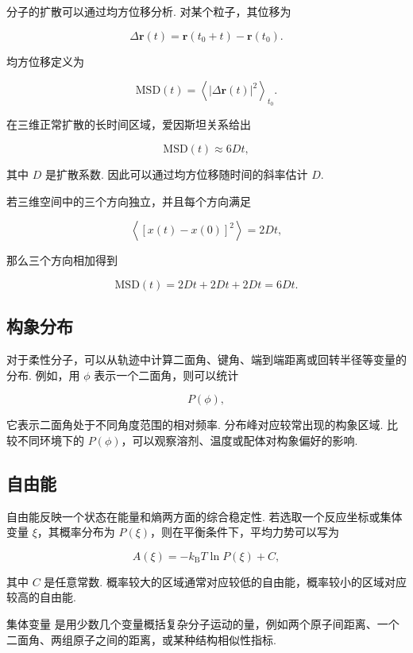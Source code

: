 \documentclass[UTF8,11pt,a4paper,openany]{ctexbook}
\begin{document}
分子的扩散可以通过均方位移分析. 对某个粒子，其位移为

\[
\Delta\mathbf r(t)
=
\mathbf r(t_0+t)-\mathbf r(t_0).
\]

均方位移定义为

\[
\mathrm{MSD}(t)
=
\left\langle
\left|\Delta\mathbf r(t)\right|^2
\right\rangle_{t_0}.
\]

在三维正常扩散的长时间区域，爱因斯坦关系给出

\[
\mathrm{MSD}(t)\approx 6Dt,
\]

其中 $D$ 是扩散系数. 因此可以通过均方位移随时间的斜率估计 $D$. 

\begin{derivationbox}
若三维空间中的三个方向独立，并且每个方向满足

\[
\left\langle [x(t)-x(0)]^2\right\rangle=2Dt,
\]

那么三个方向相加得到

\[
\mathrm{MSD}(t)
=
2Dt+2Dt+2Dt
=
6Dt.
\]
\end{derivationbox}

\subsection{构象分布}

对于柔性分子，可以从轨迹中计算二面角、键角、端到端距离或回转半径等变量的分布. 例如，用 $\phi$ 表示一个二面角，则可以统计

\[
P(\phi),
\]

它表示二面角处于不同角度范围的相对频率. 分布峰对应较常出现的构象区域. 比较不同环境下的 $P(\phi)$，可以观察溶剂、温度或配体对构象偏好的影响. 

\subsection{自由能}

自由能反映一个状态在能量和熵两方面的综合稳定性. 若选取一个反应坐标或集体变量 $\xi$，其概率分布为 $P(\xi)$，则在平衡条件下，平均力势可以写为

\[
A(\xi)
=
-k_{\mathrm B}T\ln P(\xi)+C,
\]

其中 $C$ 是任意常数. 概率较大的区域通常对应较低的自由能，概率较小的区域对应较高的自由能. 

\begin{definitionbox}
集体变量 是用少数几个变量概括复杂分子运动的量，例如两个原子间距离、一个二面角、两组原子之间的距离，或某种结构相似性指标. 
\end{definitionbox}
\end{document}
